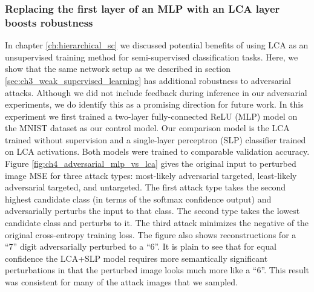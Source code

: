 \subsubsection{Replacing the first layer of an MLP with an LCA layer boosts robustness}
In chapter \ref{ch:hierarchical_sc} we discussed potential benefits of using LCA as an unsupervised training method for semi-supervised classification tasks.
Here, we show that the same network setup as we described in section \ref{sec:ch3_weak_supervised_learning} has additional robustness to adversarial attacks.
Although we did not include feedback during inference in our adversarial experiments, we do identify this as a promising direction for future work.
In this experiment we first trained a two-layer fully-connected ReLU (MLP) model on the MNIST dataset as our control model.
Our comparison model is the LCA trained without supervision and a single-layer perceptron (SLP) classifier trained on LCA activations.
Both models were trained to comparable validation accuracy.
Figure \ref{fig:ch4_adversarial_mlp_vs_lca} gives the original input to perturbed image MSE for three attack types: most-likely adversarial targeted, least-likely adversarial targeted, and untargeted.
The first attack type takes the second highest candidate class (in terms of the softmax confidence output) and adversarially perturbs the input to that class.
The second type takes the lowest candidate class and perturbs to it.
The third attack minimizes the negative of the original cross-entropy training loss.
The figure also shows reconstructions for a ``7'' digit adversarially perturbed to a ``6''.
It is plain to see that for equal confidence the LCA+SLP model requires more semantically significant perturbations in that the perturbed image looks much more like a ``6''.
This result was consistent for many of the attack images that we sampled.

